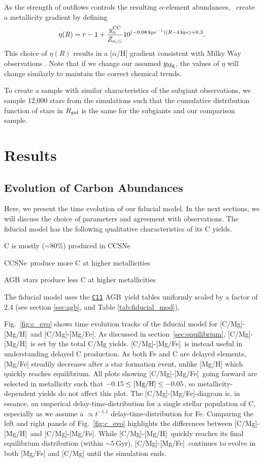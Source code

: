 \documentclass[fleqn,
usenatbib]{mnras}
\newcommand{\JJ}{\citetalias{james+21}}
\newcommand{\cxi}{\texttt{\hyperlink{C11}{C11}}}
\newcommand{\cfactor}{2.4}
\newcommand{\agb}{AGB}
\newcommand{\cc}{CCSNe}
\newcommand{\caah}{[C/Mg]-[Mg/H]}
\newcommand{\caafe}{[C/Mg]-[Mg/Fe]}
\newcommand{\about}[1]{${\sim} #1$}
\begin{document}
As the strength of outflows controls the resulting $\alpha$-element abundances, \JJ~create a metallicity gradient by defining
\begin{equation}\label{eq:mass_loading}
\eta(R) = r - 1 + \frac{y_{\alpha}^{\rm CC}}{Z_{\alpha, \odot}} 10^{(-0.08\,\text{kpc}^{-1})(R-4\,\text{kpc})+0.3}.
\end{equation}
This choice of $\eta(R)$ results in a [$\alpha$/H] gradient consistent with Milky Way observations \citep[e.g.][]{hayden+14, weinberg+19, frinchaboy+13}.
Note that if we change our assumed $y_{\rm Mg}$, the values of $\eta$ will change similarly to maintain the correct chemical trends.

To create a sample with similar characteristics of the subgiant observations, we sample 12,000 stars from the simulations such that the cumulative distribution function of stars in $R_{\rm gal}$ is the same for the subgiants and our comparison sample. 


\section{Results}

\subsection{Evolution of Carbon Abundances}

Here, we present the time evolution of our fiducial model. In the next sections, we will discuss the choice of parameters and agreement with observations. 
The fiducial model has the following qualitative characteristics of its C yields.
\begin{description}
    \item C is mostly (\about{80\%}) produced in \cc
    \item \cc\ produce more C at higher metallicities
    \item \agb\ stars produce less C at higher metallicities 
\end{description} 
The fiducial model uses the \cxi{} \agb\ yield tables uniformly scaled by a factor of \cfactor{} (see section \ref{sec:agb}, and Table \ref{tab:fiducial_mod}). 

Fig.~\ref{fig:c_evo} shows time evolution tracks of the fiducial model for \caah\ and \caafe. 
As discussed in section~\ref{sec:equilibrium}, \caah\ is set by the total C/Mg yields. 
\caafe\ is instead useful in understanding delayed C production. 
As both Fe and C are delayed elements, [Mg/Fe] steadily decreases after a star formation event, unlike [Mg/H] which quickly reaches equilibrium.  All plots showing \caafe\ going forward are selected in metallicity such that $-0.15 \leq {\rm [Mg/H]} \leq -0.05$, so metallicity-dependent yields do not affect this plot. 
The \caafe{}-diagram is, in essance, an emperical delay-time-distribution for a single stellar population of C, especially as we assume a $\propto t^{-1.1}$ delay-time-distribution for Fe. 
Comparing the left and right panels of Fig.~\ref{fig:c_evo} highlights the differences between \caah\ and \caafe. While \caah\ quickly reaches its final equilibrium distribution (within \about{5}\,Gyr), \caafe\ continues to evolve in both [Mg/Fe] and [C/Mg] until the simulation ends.
\end{document}
